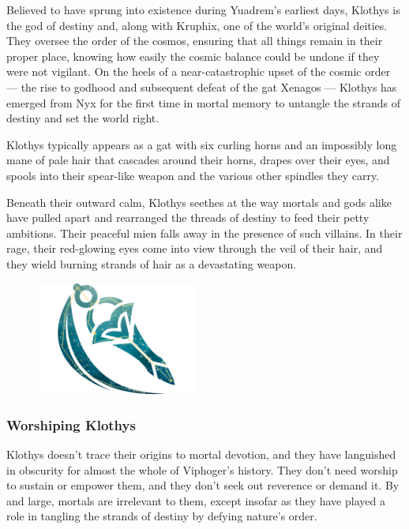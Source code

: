     Believed to have sprung into existence during Yuadrem's earliest days, Klothys is the god of destiny and, along with Kruphix, one of the world's original deities.
    They oversee the order of the cosmos, ensuring that all things remain in their proper place, knowing how easily the cosmic balance could be undone if they were not vigilant.
    On the heels of a near-catastrophic upset of the cosmic order --- the rise to godhood and subsequent defeat of the gat Xenagos --- Klothys has emerged from Nyx for the first time in mortal memory to untangle the strands of destiny and set the world right.

    Klothys typically appears as a gat with six curling horns and an impossibly long mane of pale hair that cascades around their horns, drapes over their eyes, and spools into their spear-like weapon and the various other spindles they carry.

    Beneath their outward calm, Klothys seethes at the way mortals and gods alike have pulled apart and rearranged the threads of destiny to feed their petty ambitions.
    Their peaceful mien falls away in the presence of such villains.
    In their rage, their red-glowing eyes come into view through the veil of their hair, and they wield burning strands of hair as a devastating weapon.

    \begin{figure}[t]
        \centering
        \includegraphics[width=0.47\textwidth]{02viphoger/img/10s_klothys.png}
    \end{figure}

    \subsubsection{Worshiping Klothys}
        Klothys doesn't trace their origins to mortal devotion, and they have languished in obscurity for almost the whole of Viphoger's history.
        They don't need worship to sustain or empower them, and they don't seek out reverence or demand it.
        By and large, mortals are irrelevant to them, except insofar as they have played a role in tangling the strands of destiny by defying nature's order.

